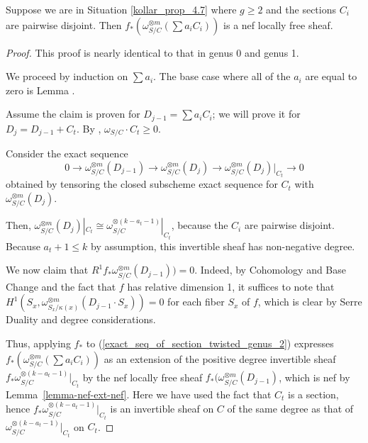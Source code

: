 \begin{lemma}\label{inductive_step_genus_2}
Suppose we are in Situation \ref{kollar_prop_4.7} where $g\ge2$ and the sections $C_i$ are pairwise disjoint.
Then $f_{*}(\omega_{S/C}^{\otimes m}(\sum a_iC_i))$ is a nef locally free sheaf.
\end{lemma}
\begin{proof}
This proof is nearly identical to that in genus 0 and genus 1.

We proceed by induction on $\sum a_i$.
The base case where all of the $a_i$ are equal to zero is Lemma .

Assume the claim is proven for $D_{j-1}=\sum a_iC_i$; we will prove it for $D_{j}=D_{j-1}+C_t$.
By , $\omega_{S/C}\cdot C_t\ge0$.

Consider the exact sequence
\begin{equation*}\label{exact_seq_of_section_twisted_genus_2}
0\to\omega_{S/C}^{\otimes m}(D_{j-1})\to\omega_{S/C}^{\otimes m}(D_j)\to \omega_{S/C}^{\otimes m}(D_j)|_{C_t}\to0
\end{equation*}
obtained by tensoring the closed subscheme exact sequence for $C_t$ with $\omega_{S/C}^{\otimes m}(D_j)$.

Then, $\omega_{S/C}^{\otimes m}(D_j)|_{C_t}\cong \omega_{S/C}^{\otimes (k-a_{t}-1)}|_{C_t}$, because the $C_i$ are pairwise disjoint.
Because $a_{t}+1\le k$ by assumption, this invertible sheaf has non-negative degree.

We now claim that $R^{1}f_{*}\omega_{S/C}^{\otimes m}(D_{j-1}))=0$.
Indeed, by Cohomology and Base Change and the fact that $f$ has relative dimension 1, it suffices to note that $H^{1}(S_x,\omega_{S_x/\kappa(x)}^{\otimes m}(D_{j-1}\cdot S_x))=0$ for each fiber $S_x$ of $f$, which is clear by Serre Duality and degree considerations.

Thus, applying $f_{*}$ to (\ref{exact_seq_of_section_twisted_genus_2})
expresses $f_{*}(\omega_{S/C}^{\otimes m}(\sum a_iC_i))$ as an extension of the
positive degree invertible sheaf
$f_*\omega_{S/C}^{\otimes (k-a_{t}-1)}|_{C_t}$ by the nef locally free sheaf
$f_*(\omega_{S/C}^{\otimes m}(D_{j-1})$, which is nef by
Lemma~\ref{lemma-nef-ext-nef}.
Here we have used the fact that $C_t$ is a section, hence $f_{*}\omega_{S/C}^{\otimes (k-a_{t}-1)}|_{C_t}$ is an invertible sheaf on $C$ of the same degree as that of $\omega_{S/C}^{\otimes (k-a_{t}-1)}|_{C_t}$ on $C_t$.
\end{proof}

